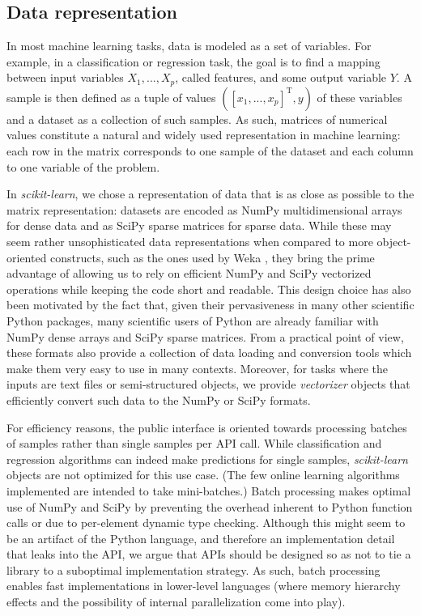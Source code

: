 \documentclass{llncs}
\newcommand{\sklearn}{\textit{scikit-learn}\xspace}
\begin{document}
\subsection{Data representation}
\label{sec:arrays}

In most machine learning tasks, data is modeled as a set of variables.  For
example, in a classification or regression task, the goal is to find a mapping
between input variables $X_1, ..., X_p$, called features, and
some output variable $Y$. A sample is then defined as a tuple of values $([x_1,
..., x_p]^\mathrm{T}, y)$ of these variables and a dataset as a collection of
such samples.  As such, matrices of numerical values constitute a natural and
widely used representation in machine learning: each row in the
matrix corresponds to one sample of the dataset and each column to one
variable of the problem.

In \sklearn, we chose a representation of data that is as close as
possible to the matrix representation: datasets are encoded as NumPy
multidimensional arrays for dense data and as SciPy sparse matrices for sparse
data. While these may seem rather unsophisticated data representations when
compared to more object-oriented constructs, such as the ones used by
Weka \citep{hall2009weka}, they bring the prime advantage of allowing us to rely
on efficient NumPy and SciPy vectorized operations while keeping
the code short and readable.  This design choice has also been motivated by
the fact that, given their pervasiveness in many other scientific Python
packages, many scientific users of Python are already familiar with NumPy dense
arrays and SciPy sparse matrices.
From a practical point of view, these formats also provide a collection of
data loading and conversion tools which make them very easy to use in many
contexts. Moreover, for tasks where the inputs are text files or semi-structured
objects, we provide \textit{vectorizer} objects that efficiently convert such
data to the NumPy or SciPy formats.

For efficiency reasons, the public interface is oriented towards processing
batches of samples rather than single samples per API call. While classification
and regression algorithms can indeed make predictions for single samples,
\sklearn objects are not optimized for this use case. (The few online learning
algorithms implemented are intended to take mini-batches.) Batch processing makes
optimal use of NumPy and SciPy by preventing the overhead inherent to Python
function calls or due to per-element dynamic type checking. Although this might
seem to be an artifact of the Python language, and therefore an implementation
detail that leaks into the API, we argue that APIs should be designed so as not
to tie a library to a suboptimal implementation strategy. As such, batch
processing enables fast implementations in lower-level languages (where memory
hierarchy effects and the possibility of internal parallelization come into
play).
\end{document}
